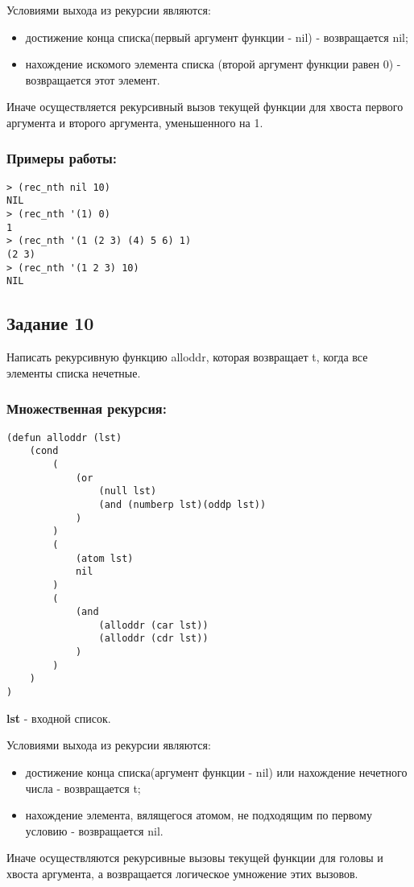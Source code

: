 \documentclass[a4paper,12pt]{article}
\begin{document}
Условиями выхода из рекурсии являются:
\begin{itemize}
	\item достижение конца списка(первый аргумент функции - nil) - возвращается nil;
	\item нахождение искомого элемента списка (второй аргумент функции равен 0) - возвращается этот элемент. 
\end{itemize} 
Иначе осуществляется рекурсивный вызов текущей функции для хвоста первого аргумента и второго аргумента, уменьшенного на 1.

\subsubsection*{Примеры работы:}
\begin{lstlisting}
> (rec_nth nil 10)
NIL
> (rec_nth '(1) 0)
1
> (rec_nth '(1 (2 3) (4) 5 6) 1)
(2 3)
> (rec_nth '(1 2 3) 10)
NIL
\end{lstlisting}

\subsection*{Задание 10}

Написать рекурсивную функцию alloddr, которая возвращает t, когда все элементы списка нечетные.

\subsubsection*{Множественная рекурсия:}
\begin{lstlisting}[caption=Функция проверки на нечетность всех элементов списка]
(defun alloddr (lst)
	(cond
		(
			(or
				(null lst)
				(and (numberp lst)(oddp lst))
			)
		)
		(
			(atom lst)
			nil
		)
		(
			(and 
				(alloddr (car lst))
				(alloddr (cdr lst))
			)
		)
	)
)
\end{lstlisting}
\textbf{lst} - входной список.

Условиями выхода из рекурсии являются:
\begin{itemize}
	\item достижение конца списка(аргумент функции - nil) или нахождение нечетного числа - возвращается t;
	\item нахождение элемента, вялящегося атомом, не подходящим по первому условию - возвращается nil.
\end{itemize}
Иначе осуществляются рекурсивные вызовы текущей функции для головы и хвоста аргумента, а возвращается логическое умножение этих вызовов.
\end{document}

